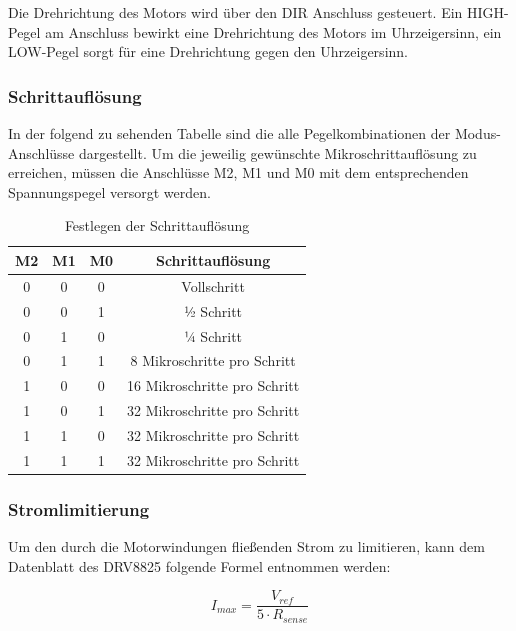 Die Drehrichtung des Motors wird über den DIR Anschluss gesteuert.
Ein HIGH-Pegel am Anschluss bewirkt eine Drehrichtung des Motors im Uhrzeigersinn, ein LOW-Pegel sorgt für eine Drehrichtung gegen den Uhrzeigersinn.

\newpage
\subsubsection{Schrittauflösung}
In der folgend zu sehenden Tabelle sind die alle Pegelkombinationen der Modus-Anschlüsse dargestellt.
Um die jeweilig gewünschte Mikroschrittauflösung zu erreichen, müssen die Anschlüsse M2, M1 und M0 mit dem entsprechenden Spannungspegel versorgt werden.

\begin{table}[h]
    \centering
    \begin{tabular}{|c|c|c|c|}
        \hline
        \textbf{M2} & \textbf{M1} & \textbf{M0} & \textbf{Schrittauflösung}    \\ \hline
        0 & 0 & 0 & Vollschritt                  \\ \hline
        0 & 0 & 1 & ½ Schritt                    \\ \hline
        0 & 1 & 0 & ¼ Schritt                    \\ \hline
        0 & 1 & 1 & 8 Mikroschritte pro Schritt  \\ \hline
        1 & 0 & 0 & 16 Mikroschritte pro Schritt \\ \hline
        1 & 0 & 1 & 32 Mikroschritte pro Schritt \\ \hline
        1 & 1 & 0 & 32 Mikroschritte pro Schritt \\ \hline
        1 & 1 & 1 & 32 Mikroschritte pro Schritt \\ \hline
    \end{tabular}
    \caption{Festlegen der Schrittauflösung}
\end{table}

\subsubsection{Stromlimitierung}
\footnotemark[14]Um den durch die Motorwindungen fließenden Strom zu limitieren, kann dem Datenblatt des DRV8825 folgende Formel entnommen werden:

\begin{equation}
    I_{max} = \frac{V_{ref}} {5 \cdot R_{sense}}
\end{equation}

